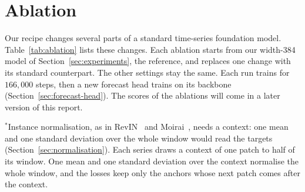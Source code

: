 \section{Ablation}
\label{sec:ablation}

Our recipe changes several parts of a standard time-series foundation
model. Table~\ref{tab:ablation} lists these changes. Each ablation
starts from our width-384 model of Section~\ref{sec:experiments}, the
reference, and replaces one change with its standard counterpart. The other settings stay the same. Each run trains for
$166{,}000$ steps, then a new forecast head trains on its backbone
(Section~\ref{sec:forecast-head}). The scores of the ablations will
come in a later version of this report.

$^{*}$Instance normalisation, as in RevIN~\citep{kim2022revin} and
Moirai~\citep{woo2024moirai}, needs a context: one mean and one standard
deviation over the whole window would read the targets
(Section~\ref{sec:normalisation}). Each series draws a context of one
patch to half of its window. One mean and one standard deviation over
the context normalise the whole window, and the losses keep only the
anchors whose next patch comes after the context.

